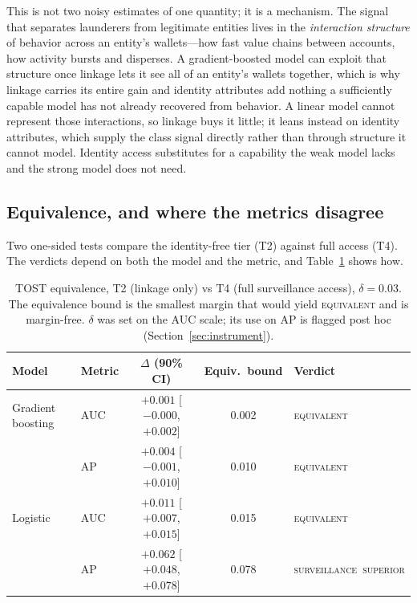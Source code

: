 \documentclass[11pt]{article}
\begin{document}
This is not two noisy estimates of one quantity; it is a mechanism. The signal that separates
launderers from legitimate entities lives in the \emph{interaction structure} of behavior across an
entity's wallets---how fast value chains between accounts, how activity bursts and disperses. A
gradient-boosted model can exploit that structure once linkage lets it see all of an entity's wallets
together, which is why linkage carries its entire gain and identity attributes add nothing a
sufficiently capable model has not already recovered from behavior. A linear model cannot represent
those interactions, so linkage buys it little; it leans instead on identity attributes, which supply
the class signal directly rather than through structure it cannot model. Identity access substitutes
for a capability the weak model lacks and the strong model does not need.

\subsection{Equivalence, and where the metrics disagree}
\label{sec:equivalence}

Two one-sided tests compare the identity-free tier (T2) against full access (T4). The verdicts depend
on both the model and the metric, and Table~\ref{tab:tost} shows how.

\begin{table}[htbp]
\centering
\caption{TOST equivalence, T2 (linkage only) vs T4 (full surveillance access), $\delta = 0.03$. The
equivalence bound is the smallest margin that would yield \textsc{equivalent} and is margin-free.
$\delta$ was set on the AUC scale; its use on AP is flagged post hoc (Section~\ref{sec:instrument}).}
\label{tab:tost}
\begin{tabular}{llccl}
\toprule
Model & Metric & $\Delta$ (90\% CI) & Equiv.\ bound & Verdict \\
\midrule
Gradient boosting & AUC & $+0.001$ [$-0.000$, $+0.002$] & 0.002 & \textsc{equivalent} \\
                  & AP  & $+0.004$ [$-0.001$, $+0.010$] & 0.010 & \textsc{equivalent} \\
\addlinespace
Logistic & AUC & $+0.011$ [$+0.007$, $+0.015$] & 0.015 & \textsc{equivalent} \\
         & AP  & $+0.062$ [$+0.048$, $+0.078$] & 0.078 & \textsc{surveillance\ superior} \\
\bottomrule
\end{tabular}
\end{table}
\end{document}
